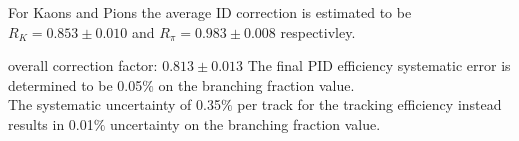\noindent For Kaons and Pions the average ID correction is estimated to be  \hspace{0.2 cm}  $R_K = 0.853 \pm 0.010$ 
 and \hspace{0.25 cm} $R_{\pi} = 0.983 \pm 0.008$  \hspace{0.25 cm} respectivley.

overall correction factor: $0.813 \pm 0.013$
\noindent The final PID efficiency systematic error is determined to be  0.05$\%$ on the branching fraction value. \\
The systematic uncertainty of 0.35$\%$ per track for the tracking efficiency instead results in 0.01$\%$ uncertainty on the branching fraction value. 


\begin{table}[h]
    \centering
    \caption{Systematic uncertainties in the determination of the  $B^+ \rightarrow \bar{\Lambda}_c^- X$ branching fraction in \si{\percent}.}
    \label{tab:systematics:ChargedCorr}
    \end{table}
    

